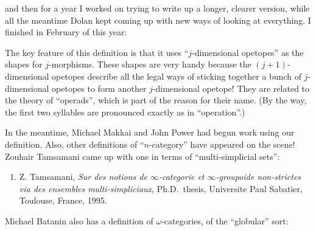 \documentclass{article}
\def\tightlist{}
\renewcommand{\texttt}[1]{%
  \begingroup
  \ttfamily
  \begingroup\lccode`~=`/\lowercase{\endgroup\def~}{/\discretionary{}{}{}}%
  \begingroup\lccode`~=`[\lowercase{\endgroup\def~}{[\discretionary{}{}{}}%
  \begingroup\lccode`~=`.\lowercase{\endgroup\def~}{.\discretionary{}{}{}}%
  \catcode`/=\active\catcode`[=\active\catcode`.=\active
  \scantokens{#1\noexpand}%
  \endgroup
}
\begin{document}

and then for a year I worked on trying to write up a longer, clearer
version, while all the meantime Dolan kept coming up with new ways of
looking at everything. I finished in February of this year:


The key feature of this definition is that it uses ``\(j\)-dimensional
opetopes'' as the shapes for \(j\)-morphisms. These shapes are very
handy because the \((j+1)\)-dimensional opetopes describe all the legal
ways of sticking together a bunch of \(j\)-dimensional opetopes to form
another \(j\)-dimensional opetope! They are related to the theory of
``operads'', which is part of the reason for their name. (By the way,
the first two syllables are pronounced exactly as in ``operation''.)

In the meantime, Michael Makkai and John Power had begun work using our
definition. Also, other definitions of ``\(n\)-category'' have appeared
on the scene! Zouhair Tamsamani came up with one in terms of
``multi-simplicial sets'':

\begin{enumerate}
\def\labelenumi{\arabic{enumi})}
\setcounter{enumi}{7}
\tightlist
\item
  Z. Tamsamani, \emph{Sur des notions de \(\infty\)-categorie et
  \(\infty\)-groupoide non-strictes via des ensembles
  multi-simpliciaux}, Ph.D.~thesis, Universite Paul Sabatier, Toulouse,
  France, 1995.
\end{enumerate}

Michael Batanin also has a definition of \(\omega\)-categories, of the
``globular'' sort:
\end{document}
